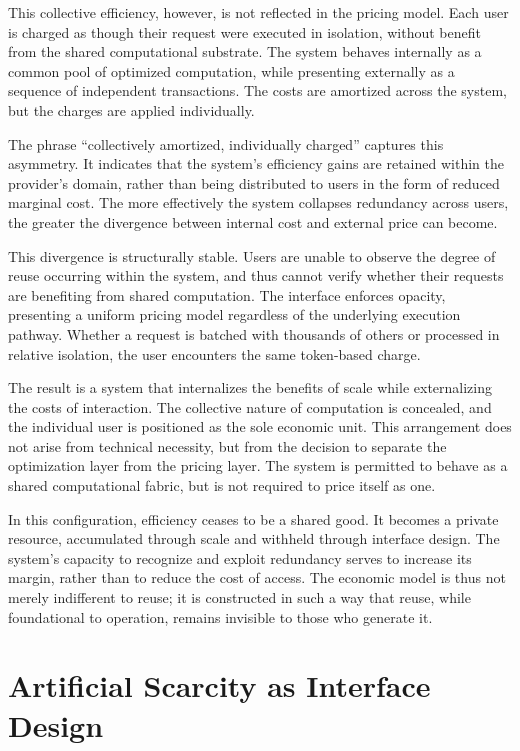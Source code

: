 \documentclass[12pt, oneside]{article}
\begin{document}
This collective efficiency, however, is not reflected in the pricing model. Each user is charged as though their request were executed in isolation, without benefit from the shared computational substrate. The system behaves internally as a common pool of optimized computation, while presenting externally as a sequence of independent transactions. The costs are amortized across the system, but the charges are applied individually.

The phrase ``collectively amortized, individually charged'' captures this asymmetry. It indicates that the system’s efficiency gains are retained within the provider’s domain, rather than being distributed to users in the form of reduced marginal cost. The more effectively the system collapses redundancy across users, the greater the divergence between internal cost and external price can become.

This divergence is structurally stable. Users are unable to observe the degree of reuse occurring within the system, and thus cannot verify whether their requests are benefiting from shared computation. The interface enforces opacity, presenting a uniform pricing model regardless of the underlying execution pathway. Whether a request is batched with thousands of others or processed in relative isolation, the user encounters the same token-based charge.

The result is a system that internalizes the benefits of scale while externalizing the costs of interaction. The collective nature of computation is concealed, and the individual user is positioned as the sole economic unit. This arrangement does not arise from technical necessity, but from the decision to separate the optimization layer from the pricing layer. The system is permitted to behave as a shared computational fabric, but is not required to price itself as one.

In this configuration, efficiency ceases to be a shared good. It becomes a private resource, accumulated through scale and withheld through interface design. The system’s capacity to recognize and exploit redundancy serves to increase its margin, rather than to reduce the cost of access. The economic model is thus not merely indifferent to reuse; it is constructed in such a way that reuse, while foundational to operation, remains invisible to those who generate it.

\section{Artificial Scarcity as Interface Design}
\end{document}
